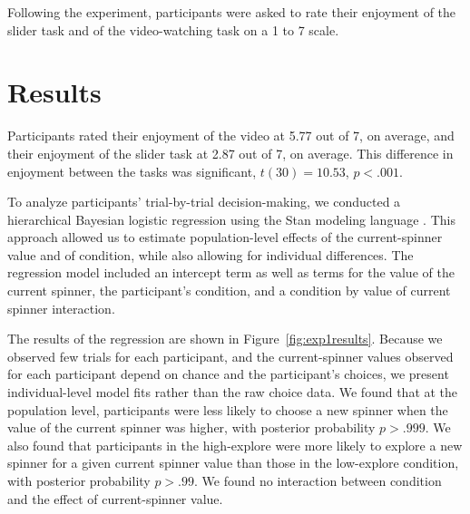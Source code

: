 \documentclass[10pt,letterpaper]{article}
\begin{document}
Following the experiment, participants were asked to rate their enjoyment of the
slider task and of the video-watching task on a 1 to 7 scale.


\section{Results}


Participants rated their enjoyment of the video at 5.77 out of 7, on average,
and their enjoyment of the slider task at 2.87 out of 7, on average. This
difference in enjoyment between the tasks was significant, $t(30)=10.53$, $p<.001$.

To analyze participants' trial-by-trial decision-making, we conducted a hierarchical
Bayesian logistic regression using the Stan modeling language \citep{stan-software:2015}.
This approach allowed us to estimate population-level effects of the
current-spinner value and of condition, while also allowing for individual
differences. The regression model included an intercept term as well as terms
for the value of the current spinner, the participant's condition, and a
condition by value of current spinner interaction.

The results of the regression are shown in Figure~\ref{fig:exp1results}.
Because we observed few trials for each participant, and the current-spinner
values observed for each participant depend on chance and the participant's
choices, we present individual-level model fits rather than the raw choice data.
We found that at the population level, participants were less likely to choose a
new spinner when the value of the current spinner was higher, with posterior
probability $p>.999$. We also found that participants in the high-explore were more likely to explore a new spinner for a
given current spinner value than those in the low-explore condition, with
posterior probability $p>.99$. We found no interaction between condition and the
effect of current-spinner value.
\end{document}
